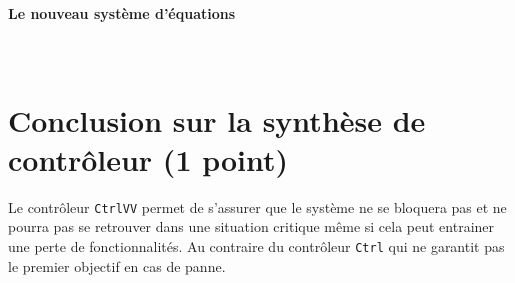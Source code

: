 \documentclass[a4paper]{book}
\begin{document}
\paragraph{Le nouveau système d'équations}\ \\
\small{}

\section{Conclusion sur la synthèse de contrôleur (1 point)}

Le contrôleur \texttt{CtrlVV} permet de s'assurer que le système ne se bloquera
pas et ne pourra pas se retrouver dans une situation critique même si cela peut
entrainer une perte de fonctionnalités.
Au contraire du contrôleur \texttt{Ctrl} qui ne garantit pas le premier
objectif en cas de panne.
\end{document}
